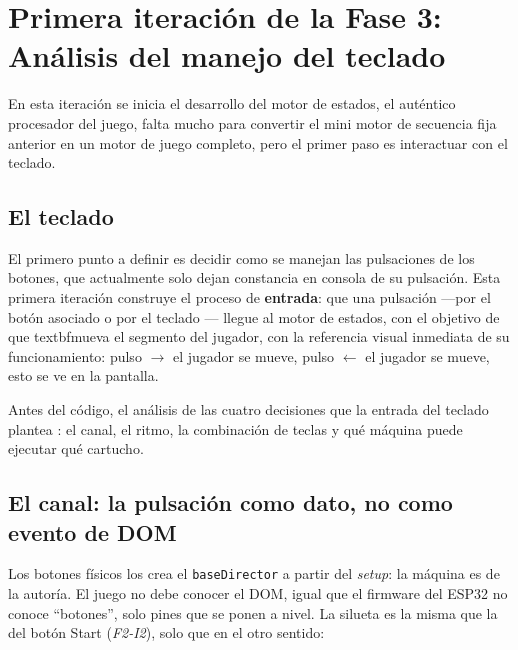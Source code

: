 \section{Primera iteración de la Fase 3: Análisis del manejo del teclado}
\label{sec:AnalisisEntrada}

En esta iteración se inicia  el desarrollo del motor de estados, el auténtico procesador del juego, falta mucho para convertir el mini motor de secuencia fija anterior en un motor de juego completo, pero el primer paso es interactuar con el teclado.

\subsection{El teclado}

El primero punto a definir es decidir como se manejan las pulsaciones de los botones, que actualmente solo dejan constancia en consola de su pulsación.
Esta primera iteración construye el proceso de \textbf{entrada}: que una pulsación ---por el botón asociado o por el teclado --- llegue al motor de estados, con el objetivo de que textbf{mueva el segmento del jugador}, con la referencia visual inmediata de su funcionamiento:  pulso $\rightarrow$ el jugador se mueve, pulso $\leftarrow$ el jugador se mueve, esto se ve en la pantalla. 

Antes del código, el análisis de las cuatro decisiones que la entrada del teclado plantea : el canal, el ritmo, la combinación de teclas y qué máquina puede ejecutar qué cartucho.

\subsection{El canal: la pulsación como dato, no como evento de DOM}
\label{subsec:CanalEntrada}

Los botones físicos los crea el \texttt{baseDirector} a partir del \textit{setup}: la
máquina es de la autoría. El juego no debe conocer el DOM, igual que el firmware del ESP32
no conoce ``botones'', solo pines que se ponen a nivel. La silueta es la misma que la del botón 
Start (\emph{F2-I2}), solo que en el otro sentido:

